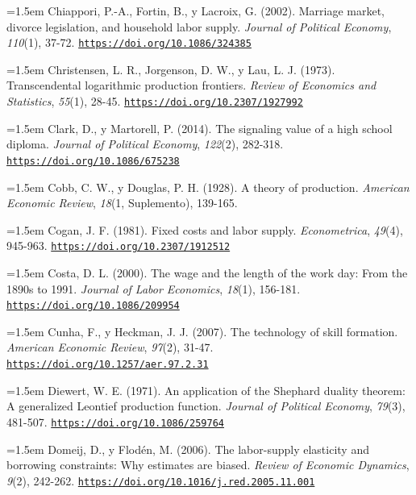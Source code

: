 \documentclass[10pt,a4paper]{article}
\begin{document}
\noindent\hangindent=1.5em Chiappori, P.-A., Fortin, B., y Lacroix, G. (2002). Marriage market, divorce legislation, and household labor supply. \textit{Journal of Political Economy}, \textit{110}(1), 37-72. \href{https://doi.org/10.1086/324385}{\nolinkurl{https://doi.org/10.1086/324385}}

\noindent\hangindent=1.5em Christensen, L. R., Jorgenson, D. W., y Lau, L. J. (1973). Transcendental logarithmic production frontiers. \textit{Review of Economics and Statistics}, \textit{55}(1), 28-45. \href{https://doi.org/10.2307/1927992}{\nolinkurl{https://doi.org/10.2307/1927992}}

\noindent\hangindent=1.5em Clark, D., y Martorell, P. (2014). The signaling value of a high school diploma. \textit{Journal of Political Economy}, \textit{122}(2), 282-318. \href{https://doi.org/10.1086/675238}{\nolinkurl{https://doi.org/10.1086/675238}}

\noindent\hangindent=1.5em Cobb, C. W., y Douglas, P. H. (1928). A theory of production. \textit{American Economic Review}, \textit{18}(1, Suplemento), 139-165.

\noindent\hangindent=1.5em Cogan, J. F. (1981). Fixed costs and labor supply. \textit{Econometrica}, \textit{49}(4), 945-963. \href{https://doi.org/10.2307/1912512}{\nolinkurl{https://doi.org/10.2307/1912512}}

\noindent\hangindent=1.5em Costa, D. L. (2000). The wage and the length of the work day: From the 1890s to 1991. \textit{Journal of Labor Economics}, \textit{18}(1), 156-181. \href{https://doi.org/10.1086/209954}{\nolinkurl{https://doi.org/10.1086/209954}}

\noindent\hangindent=1.5em Cunha, F., y Heckman, J. J. (2007). The technology of skill formation. \textit{American Economic Review}, \textit{97}(2), 31-47. \href{https://doi.org/10.1257/aer.97.2.31}{\nolinkurl{https://doi.org/10.1257/aer.97.2.31}}

\noindent\hangindent=1.5em Diewert, W. E. (1971). An application of the Shephard duality theorem: A generalized Leontief production function. \textit{Journal of Political Economy}, \textit{79}(3), 481-507. \href{https://doi.org/10.1086/259764}{\nolinkurl{https://doi.org/10.1086/259764}}

\noindent\hangindent=1.5em Domeij, D., y Flodén, M. (2006). The labor-supply elasticity and borrowing constraints: Why estimates are biased. \textit{Review of Economic Dynamics}, \textit{9}(2), 242-262. \href{https://doi.org/10.1016/j.red.2005.11.001}{\nolinkurl{https://doi.org/10.1016/j.red.2005.11.001}}
\end{document}
